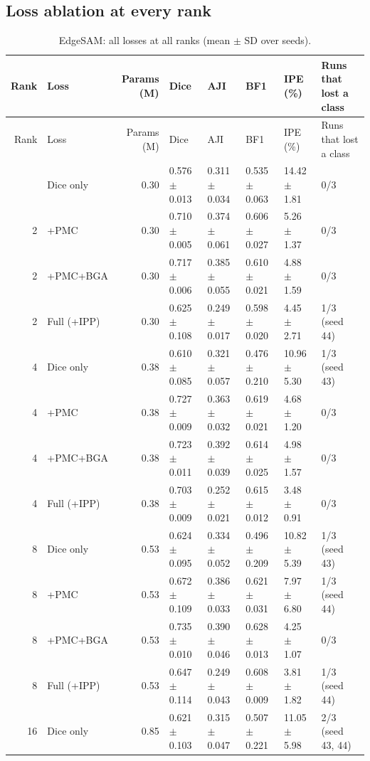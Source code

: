 \documentclass[10pt]{article}
\begin{document}
\begin{landscape}
\section{Loss ablation at every rank}
{\footnotesize
\begin{longtable}{r l r l l l l l}
\caption{EdgeSAM: all losses at all ranks (mean $\pm$ SD over seeds).}\label{tab:abl_edge_sam}\\
\toprule
Rank & Loss & Params (M) & Dice & AJI & BF1 & IPE (\%) & Runs that lost a class \\
\midrule
\endfirsthead
\toprule
Rank & Loss & Params (M) & Dice & AJI & BF1 & IPE (\%) & Runs that lost a class \\
\midrule
\endhead
\bottomrule
\endfoot
2 & Dice only & 0.30 & 0.576 $\pm$ 0.013 & 0.311 $\pm$ 0.034 & 0.535 $\pm$ 0.063 & 14.42 $\pm$ 1.81 & 0/3 \\
2 & +PMC & 0.30 & 0.710 $\pm$ 0.005 & 0.374 $\pm$ 0.061 & 0.606 $\pm$ 0.027 & 5.26 $\pm$ 1.37 & 0/3 \\
2 & +PMC+BGA & 0.30 & 0.717 $\pm$ 0.006 & 0.385 $\pm$ 0.055 & 0.610 $\pm$ 0.021 & 4.88 $\pm$ 1.59 & 0/3 \\
2 & Full (+IPP) & 0.30 & 0.625 $\pm$ 0.108 & 0.249 $\pm$ 0.017 & 0.598 $\pm$ 0.020 & 4.45 $\pm$ 2.71 & 1/3 (seed 44) \\
4 & Dice only & 0.38 & 0.610 $\pm$ 0.085 & 0.321 $\pm$ 0.057 & 0.476 $\pm$ 0.210 & 10.96 $\pm$ 5.30 & 1/3 (seed 43) \\
4 & +PMC & 0.38 & 0.727 $\pm$ 0.009 & 0.363 $\pm$ 0.032 & 0.619 $\pm$ 0.021 & 4.68 $\pm$ 1.20 & 0/3 \\
4 & +PMC+BGA & 0.38 & 0.723 $\pm$ 0.011 & 0.392 $\pm$ 0.039 & 0.614 $\pm$ 0.025 & 4.98 $\pm$ 1.57 & 0/3 \\
4 & Full (+IPP) & 0.38 & 0.703 $\pm$ 0.009 & 0.252 $\pm$ 0.021 & 0.615 $\pm$ 0.012 & 3.48 $\pm$ 0.91 & 0/3 \\
8 & Dice only & 0.53 & 0.624 $\pm$ 0.095 & 0.334 $\pm$ 0.052 & 0.496 $\pm$ 0.209 & 10.82 $\pm$ 5.39 & 1/3 (seed 43) \\
8 & +PMC & 0.53 & 0.672 $\pm$ 0.109 & 0.386 $\pm$ 0.033 & 0.621 $\pm$ 0.031 & 7.97 $\pm$ 6.80 & 1/3 (seed 44) \\
8 & +PMC+BGA & 0.53 & 0.735 $\pm$ 0.010 & 0.390 $\pm$ 0.046 & 0.628 $\pm$ 0.013 & 4.25 $\pm$ 1.07 & 0/3 \\
8 & Full (+IPP) & 0.53 & 0.647 $\pm$ 0.114 & 0.249 $\pm$ 0.043 & 0.608 $\pm$ 0.009 & 3.81 $\pm$ 1.82 & 1/3 (seed 44) \\
16 & Dice only & 0.85 & 0.621 $\pm$ 0.103 & 0.315 $\pm$ 0.047 & 0.507 $\pm$ 0.221 & 11.05 $\pm$ 5.98 & 2/3 (seed 43, 44) \\

\end{longtable}}
\end{landscape}
\end{document}
